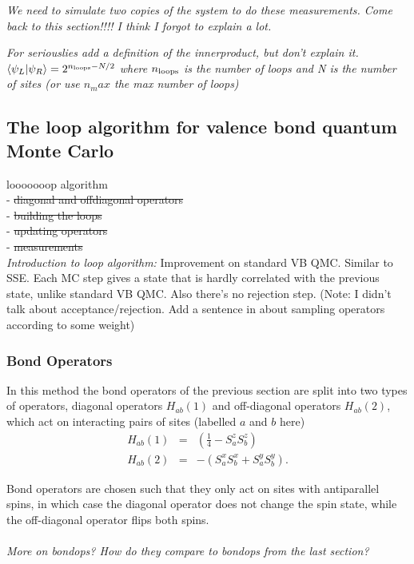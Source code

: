 \documentclass[prb,aps,twocolumn,floatfix,amsmath,amssymb,superscriptaddress,tightenlines]{revtex4}
\begin{document}
{\it We need to simulate two copies of the system to do these measurements.  
Come back to this section!!!!  I think I forgot to explain a lot. }

{\it For seriouslies add a definition of the innerproduct, but don't explain it.  
$\langle \psi_L \rvert \psi_R \rangle = 2^{n_{\rm loops} - N/2}$ where $n_{\rm loops}$ is the number
of loops and N is the number of sites  (or use $n_max$ the max number of loops)
}

\subsection{The loop algorithm for valence bond quantum Monte Carlo}

looooooop algorithm \\
- \sout{ diagonal and offdiagonal operators}\\
- \sout{building the loops} \\
- \sout{updating operators} \\
- \sout{measurements} \\

{\it Introduction to loop algorithm:}
Improvement on standard VB QMC.  Similar to SSE.  Each MC step gives a state that is hardly correlated with the previous state, unlike standard VB QMC.  Also there's no rejection step.  (Note: I didn't talk about acceptance/rejection.  Add a sentence in about sampling operators according to some weight)

\subsubsection{Bond Operators}

In this method the bond operators of the previous section are split into two types of  operators, diagonal operators $H_{ab}(1)$ and off-diagonal operators $H_{ab}(2)$, which act on interacting pairs of sites (labelled $a$ and $b$ here)
\begin{eqnarray}
	H_{ab}(1) &=&(\tfrac{1}{4} - S^z_aS^z_b) \\
	H_{ab}(2) &=& -(S_a^xS_b^x + S_a^yS_b^y). 
\end{eqnarray}

Bond operators are chosen such that they only act on sites with antiparallel spins, in which case the diagonal operator does not change the spin state, while the off-diagonal operator  flips both spins.
\\\\{\it More on bondops? How do they compare to bondops from the last section?}
\\
\end{document}
